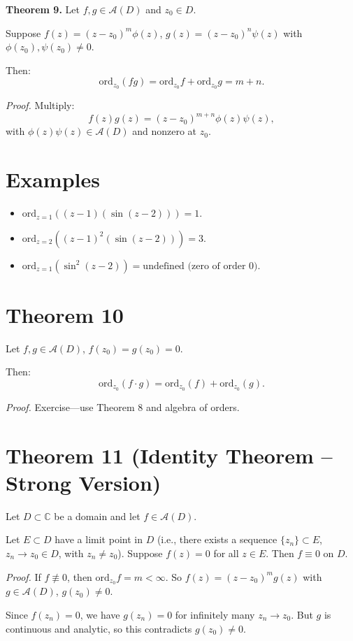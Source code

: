 \documentclass[12pt]{article}
\theoremstyle{definition} %
\theoremstyle{plain} %
\begin{document}
\textbf{Theorem 9.} Let $f, g \in \mathcal{A}(D)$ and $z_0 \in D$.

Suppose $f(z) = (z - z_0)^m \phi(z)$, $g(z) = (z - z_0)^n \psi(z)$ with $\phi(z_0), \psi(z_0) \neq 0$.

Then:
\[
\text{ord}_{z_0}(fg) = \text{ord}_{z_0} f + \text{ord}_{z_0} g = m + n.
\]

\textit{Proof.} Multiply:
\[
f(z)g(z) = (z - z_0)^{m+n} \phi(z)\psi(z),
\]
with $\phi(z)\psi(z) \in \mathcal{A}(D)$ and nonzero at $z_0$.

\section*{Examples}

\begin{itemize}
    \item $\text{ord}_{z=1}((z - 1)(\sin(z - 2))) = 1$.
    \item $\text{ord}_{z=2}((z - 1)^2(\sin(z - 2))) = 3$.
    \item $\text{ord}_{z=1}(\sin^2(z - 2)) = \text{undefined (zero of order 0)}$.
\end{itemize}

\section*{Theorem 10}

Let $f, g \in \mathcal{A}(D)$, $f(z_0) = g(z_0) = 0$.

Then:
\[
\text{ord}_{z_0}(f \cdot g) = \text{ord}_{z_0}(f) + \text{ord}_{z_0}(g).
\]

\textit{Proof.} Exercise—use Theorem 8 and algebra of orders.
\section*{Theorem 11 (Identity Theorem – Strong Version)}

Let $D \subset \mathbb{C}$ be a domain and let $f \in \mathcal{A}(D)$.

Let $E \subset D$ have a limit point in $D$ (i.e., there exists a sequence $\{z_n\} \subset E$, $z_n \to z_0 \in D$, with $z_n \neq z_0$). Suppose $f(z) = 0$ for all $z \in E$. Then $f \equiv 0$ on $D$.

\textit{Proof.} If $f \not\equiv 0$, then $\text{ord}_{z_0} f = m < \infty$. So $f(z) = (z - z_0)^m g(z)$ with $g \in \mathcal{A}(D)$, $g(z_0) \neq 0$.

Since $f(z_n) = 0$, we have $g(z_n) = 0$ for infinitely many $z_n \to z_0$. But $g$ is continuous and analytic, so this contradicts $g(z_0) \neq 0$.
\end{document}
